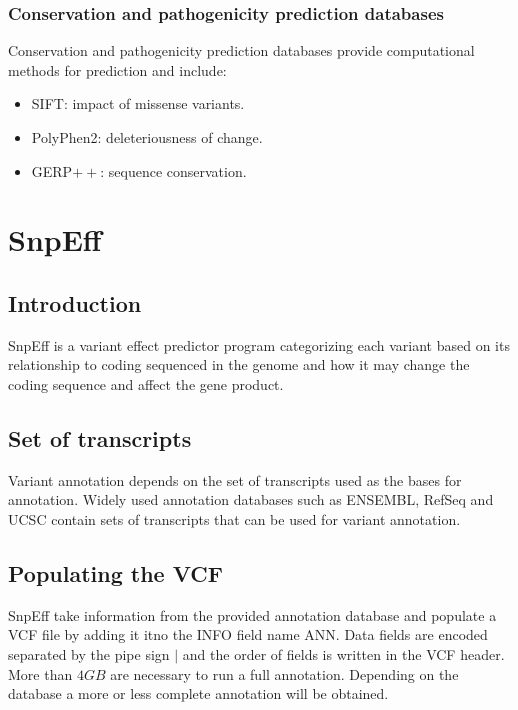 		\subsubsection{Conservation and pathogenicity prediction databases}
		Conservation and pathogenicity prediction databases provide computational methods for prediction and include:

		\begin{multicols}{3}
			\begin{itemize}
				\item SIFT: impact of missense variants.
				\item PolyPhen2: deleteriousness of change.
				\item GERP$++$: sequence conservation.
			\end{itemize}
		\end{multicols}

\section{SnpEff}

	\subsection{Introduction}
	SnpEff is a variant effect predictor program categorizing each variant based on its relationship to coding sequenced in the genome and how it may change the coding sequence and affect the gene product.

	\subsection{Set of transcripts}
	Variant annotation depends on the set of transcripts used as the bases for annotation.
	Widely used annotation databases such as ENSEMBL, RefSeq and UCSC contain sets of transcripts that can be used for variant annotation.

	\subsection{Populating the VCF}
	SnpEff take information from the provided annotation database and populate a VCF file by adding it itno the INFO field name ANN.
	Data fields are encoded separated by the pipe sign $|$ and the order of fields is written in the VCF header.
	More than $4GB$ are necessary to run a full annotation.
	Depending on the database a more or less complete annotation will be obtained.

